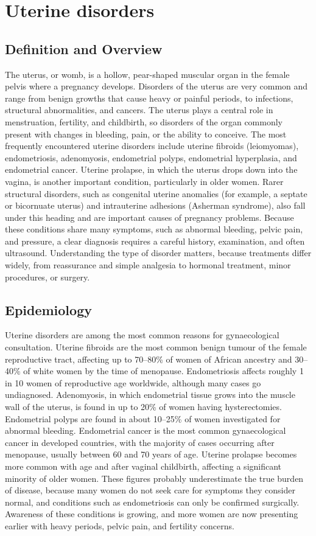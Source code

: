 \chapter{Uterine disorders}

\section*{Definition and Overview}
The uterus, or womb, is a hollow, pear-shaped muscular organ in the female pelvis where a pregnancy develops. Disorders of the uterus are very common and range from benign growths that cause heavy or painful periods, to infections, structural abnormalities, and cancers. The uterus plays a central role in menstruation, fertility, and childbirth, so disorders of the organ commonly present with changes in bleeding, pain, or the ability to conceive. The most frequently encountered uterine disorders include uterine fibroids (leiomyomas), endometriosis, adenomyosis, endometrial polyps, endometrial hyperplasia, and endometrial cancer. Uterine prolapse, in which the uterus drops down into the vagina, is another important condition, particularly in older women. Rarer structural disorders, such as congenital uterine anomalies (for example, a septate or bicornuate uterus) and intrauterine adhesions (Asherman syndrome), also fall under this heading and are important causes of pregnancy problems. Because these conditions share many symptoms, such as abnormal bleeding, pelvic pain, and pressure, a clear diagnosis requires a careful history, examination, and often ultrasound. Understanding the type of disorder matters, because treatments differ widely, from reassurance and simple analgesia to hormonal treatment, minor procedures, or surgery.

\section*{Epidemiology}
Uterine disorders are among the most common reasons for gynaecological consultation. Uterine fibroids are the most common benign tumour of the female reproductive tract, affecting up to 70--80\% of women of African ancestry and 30--40\% of white women by the time of menopause. Endometriosis affects roughly 1 in 10 women of reproductive age worldwide, although many cases go undiagnosed. Adenomyosis, in which endometrial tissue grows into the muscle wall of the uterus, is found in up to 20\% of women having hysterectomies. Endometrial polyps are found in about 10--25\% of women investigated for abnormal bleeding. Endometrial cancer is the most common gynaecological cancer in developed countries, with the majority of cases occurring after menopause, usually between 60 and 70 years of age. Uterine prolapse becomes more common with age and after vaginal childbirth, affecting a significant minority of older women. These figures probably underestimate the true burden of disease, because many women do not seek care for symptoms they consider normal, and conditions such as endometriosis can only be confirmed surgically. Awareness of these conditions is growing, and more women are now presenting earlier with heavy periods, pelvic pain, and fertility concerns.

